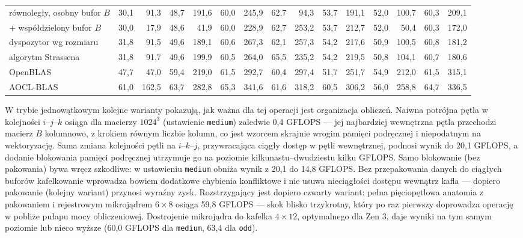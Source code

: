\documentclass[a4paper,12pt]{book} %
\begin{document}
\begin{landscape}
\begin{table}
\begin{tabular}{l rr rr rr rr rr rr rr}
równoległy, osobny bufor $B$             & 30,1 &  91,3 & 48,7 & 191,6 & 60,0 & 245,9 & 62,7 &  94,3 & 53,7 & 191,1 & 52,0 & 100,7 & 60,3 & 209,1 \\
{}+ współdzielony bufor $B$              & 30,0 &  17,9 & 48,6 &  41,9 & 60,0 & 228,9 & 62,7 & 253,2 & 53,7 & 212,7 & 52,0 &  50,4 & 60,3 & 172,0 \\
dyspozytor wg rozmiaru                   & 31,8 &  91,5 & 49,6 & 189,1 & 60,6 & 267,3 & 62,1 & 257,3 & 54,2 & 217,6 & 50,9 & 100,5 & 60,8 & 181,2 \\
algorytm Strassena                       & 31,8 &  91,7 & 49,6 & 199,9 & 60,5 & 264,0 & 65,5 & 235,2 & 54,2 & 219,5 & 50,8 & 104,1 & 60,7 & 180,6 \\
OpenBLAS                                 & 47,7 &  47,0 & 59,4 & 219,0 & 61,5 & 292,7 & 60,4 & 297,4 & 51,7 & 251,7 & 54,9 & 212,0 & 61,5 & 315,1 \\
AOCL-BLAS                                & 61,0 & 162,5 & 63,7 & 282,8 & 65,3 & 341,6 & 61,6 & 318,2 & 60,5 & 306,2 & 56,0 & 258,8 & 64,7 & 336,5 \\
\hline
\end{tabular}
\end{table}
\end{landscape}

W trybie jednowątkowym kolejne warianty pokazują, jak ważna dla tej operacji jest organizacja obliczeń. Naiwna potrójna pętla w kolejności $i$--$j$--$k$ osiąga dla macierzy $1024^3$ (ustawienie \texttt{medium}) zaledwie 0,4 GFLOPS --- jej najbardziej wewnętrzna pętla przechodzi macierz $B$ kolumnowo, z krokiem równym liczbie kolumn, co jest wzorcem skrajnie wrogim pamięci podręcznej i niepodatnym na wektoryzację. Sama zmiana kolejności pętli na $i$--$k$--$j$, przywracająca ciągły dostęp w pętli wewnętrznej, podnosi wynik do 20,1 GFLOPS, a dodanie blokowania pamięci podręcznej utrzymuje go na poziomie kilkunastu--dwudziestu kilku GFLOPS. Samo blokowanie (bez pakowania) bywa wręcz szkodliwe: w ustawieniu \texttt{medium} obniża wynik z 20,1 do 14,8 GFLOPS. Bez przepakowania danych do ciągłych buforów kafelkowanie wprowadza bowiem dodatkowe chybienia konfliktowe i nie usuwa nieciągłości dostępu wewnątrz kafla --- dopiero pakowanie (kolejny wariant) przynosi wyraźny zysk. Rozstrzygający jest dopiero czwarty wariant: pełna pięciopętlowa anatomia z pakowaniem i rejestrowym mikrojądrem $6 \times 8$ osiąga 59,8 GFLOPS --- skok blisko trzykrotny, który po raz pierwszy doprowadza operację w pobliże pułapu mocy obliczeniowej. Dostrojenie mikrojądra do kafelka $4 \times 12$, optymalnego dla Zen 3, daje wyniki na tym samym poziomie lub nieco wyższe (60,0 GFLOPS dla \texttt{medium}, 63,4 dla \texttt{odd}).
\end{document}
